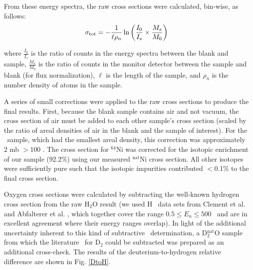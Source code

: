 From these energy spectra, the raw cross sections were calculated, bin-wise, as follows:
\begin{equation} \label{CSCalculation}
    \tot = -\frac{1}{\ell\rho_{n}}
    \ln \left(\frac{I_{0}}{I_{s}}\times\frac{M_{s}}{M_{0}}\right)
\end{equation}

\noindent
where $\frac{I_{0}}{I_{s}}$ is the ratio of counts in the energy spectra between 
the blank and sample, $\frac{M_{s}}{M_{0}}$ is the ratio of counts in the
monitor detector between the sample and blank (for flux normalization), $\ell$ is the length 
of the sample, and $\rho_{n}$ is the number density of atoms in the sample.

A series of small corrections were applied to the raw cross sections to produce
the final results. First, because the blank sample contains air and not vacuum,
the cross section of air must be added to each other sample's cross section (scaled by  
the ratio of areal densities of air in the blank and the sample of interest).
For the \rhThree\ sample, which had the smallest areal density, this correction
was approximately 2 mb $>$100 \mega\electronvolt. The cross section for $^{64}$Ni was corrected for the 
isotopic enrichment of our
sample (92.2\%) using our measured $^{\text{nat}}$Ni cross section. All other isotopes were 
sufficiently pure such that the isotopic impurities contributed $<$0.1\% to the final
cross section.

Oxygen cross sections were calculated by
subtracting the well-known hydrogen cross section from the raw H$_{2}$O result
(we used H \tot\ data sets from Clement et al. \cite{Clement1972} and Abfalterer
et al. \cite{Abfalterer2001}, which together cover the range $0.5 \leq E_n \leq 500$ 
\mega\electronvolt\ and
are in excellent agreement where their energy ranges overlap). In light of
the additional uncertainty inherent to this kind of subtractive \tot\
determination, a D$_{2}^{\text{nat}}$O sample from which the literature \tot\ for
D$_{2}$ could be subtracted was prepared as an additional cross-check. The
results of the deuterium-to-hydrogen relative difference are shown in Fig. \ref{DtoH}. 

